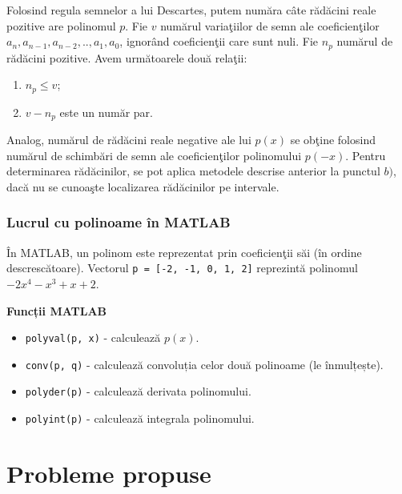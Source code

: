 \documentclass{exam}
\begin{document}
Folosind regula semnelor a lui Descartes, putem număra câte rădăcini reale
pozitive are polinomul $p$. Fie $v$ numărul variaţiilor de semn ale
coeficienţilor $a_{n}, a_{n-1}, a_{n-2},.., a_{1},a_{0}$, ignorând coeficienţii
care sunt nuli. Fie $n_{p}$ numărul de rădăcini pozitive. Avem următoarele două
relaţii:
\begin{enumerate}
	\item $n_{p}\leq v$;
	\item $v-n_{p}$ este un număr par.
\end{enumerate}

Analog, numărul de rădăcini reale negative ale lui $p(x)$ se obţine folosind numărul de schimbări de semn ale coeficienţilor polinomului  $p(-x)$.
Pentru determinarea rădăcinilor, se pot aplica metodele descrise anterior la punctul $b)$, dacă nu se cunoaşte localizarea rădăcinilor pe intervale.

\subsubsection{Lucrul cu polinoame în MATLAB}

În MATLAB, un polinom este reprezentat prin coeficienţii săi (în ordine descrescătoare). Vectorul \verb|p = [-2, -1, 0, 1, 2]| reprezintă polinomul $-2x^{4}-x^{3}+x+2$.

\textbf{Funcții MATLAB}
\begin{itemize}
	\item \verb|polyval(p, x)| - calculează $p(x)$.
	\item \verb|conv(p, q)| - calculează convoluția celor două polinoame (le înmulțește).
	\item \verb|polyder(p)| - calculează derivata polinomului.
	\item \verb|polyint(p)| - calculează integrala polinomului.
\end{itemize}

\section{Probleme propuse}
\end{document}
